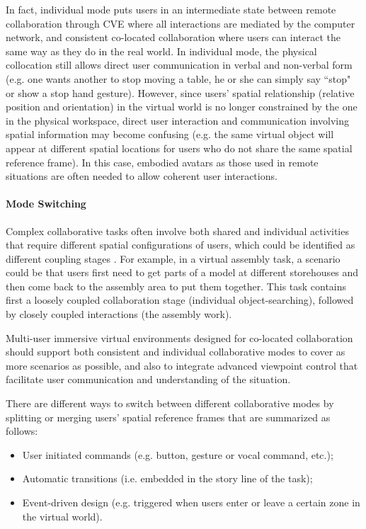 In fact, individual mode puts users in an intermediate state between remote collaboration through CVE where all interactions are mediated by the computer network, and consistent co-located collaboration where users can interact the same way as they do in the real world. In individual mode, the physical collocation still allows direct user communication in verbal and non-verbal form (e.g. one wants another to stop moving a table, he or she can simply say ``stop" or show a stop hand gesture). However, since users' spatial relationship (relative position and orientation) in the virtual world is no longer constrained by the one in the physical workspace, direct user interaction and communication involving spatial information may become confusing (e.g. the same virtual object will appear at different spatial locations for users who do not share the same spatial reference frame). In this case, embodied avatars as those used in remote situations are often needed to allow coherent user interactions.


\paragraph{Mode Switching}
Complex collaborative tasks often involve both shared and individual activities that require different spatial configurations of users, which could be identified as different coupling stages \citep{Lissermann2014PMC}. For example, in a virtual assembly task, a scenario could be that users first need to get parts of a model at different storehouses and then come back to the assembly area to put them together. This task contains first a loosely coupled collaboration stage (individual object-searching), followed by closely coupled interactions (the assembly work). 

Multi-user immersive virtual environments designed for co-located collaboration should support both consistent and individual collaborative modes to cover as more scenarios as possible, and also to integrate advanced viewpoint control that facilitate user communication and understanding of the situation.

There are different ways to switch between different collaborative modes by splitting or merging users' spatial reference frames that are summarized as follows:

\begin{itemize}
\item User initiated commands (e.g. button, gesture or vocal command, etc.);
\item Automatic transitions (i.e. embedded in the story line of the task);
\item Event-driven design (e.g. triggered when users enter or leave a certain zone in the virtual world).
\end{itemize}


